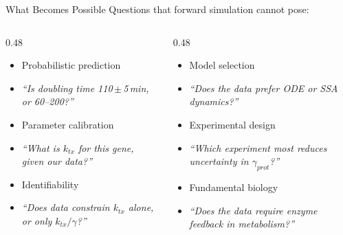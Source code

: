 \documentclass[aspectratio=169]{beamer}
\begin{document}
\begin{frame}{What Becomes Possible}
	\small
	Questions that forward simulation cannot pose:
	\medskip
	\begin{columns}[T]

		\begin{column}{0.48\textwidth}
			
			\begin{itemize}\itemsep4pt
				\item Probabilistic prediction
				\item[] {\scriptsize\itshape ``Is doubling time 110\,$\pm$\,5\,min, or 60--200?''}
				\item Parameter calibration
				\item[] {\scriptsize\itshape ``What is $k_{tx}$ for this gene, given our data?''}
				\item Identifiability
				\item[] {\scriptsize\itshape ``Does data constrain $k_{tx}$ alone, or only $k_{tx}/\gamma$?''}
			\end{itemize}


		\end{column}
		\begin{column}{0.48\textwidth}
			\begin{itemize}\itemsep4pt
				\item Model selection
				\item[] {\scriptsize\itshape ``Does the data prefer ODE or SSA dynamics?''}
				\item Experimental design
				\item[] {\scriptsize\itshape ``Which experiment most reduces uncertainty in $\gamma_{prot}$?''}
				\item Fundamental biology
				\item[] {\scriptsize\itshape ``Does the data require enzyme feedback in metabolism?''}
			\end{itemize}

		\end{column}
	\end{columns}


\end{frame}
\end{document}
